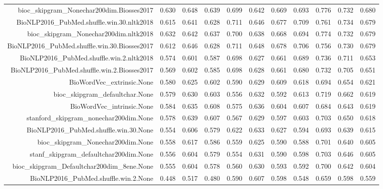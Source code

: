 \begin{table}[!h]
\begin{tabular}{rrrrrrrrrrr}
  bioc\_skipgram\_Nonechar200dim.Biosses2017 & 0.630 & 0.648 & 0.639 & 0.699 & 0.642 & 0.669 & 0.693 & 0.776 & 0.732 & 0.680 \\ 
  BioNLP2016\_PubMed.shuffle.win.30.nltk2018 & 0.615 & 0.641 & 0.628 & 0.711 & 0.646 & 0.677 & 0.709 & 0.761 & 0.734 & 0.679 \\ 
  bioc\_skipgram\_Nonechar200dim.nltk2018 & 0.632 & 0.642 & 0.637 & 0.700 & 0.638 & 0.668 & 0.694 & 0.774 & 0.732 & 0.679 \\ 
  BioNLP2016\_PubMed.shuffle.win.30.Biosses2017 & 0.612 & 0.646 & 0.628 & 0.711 & 0.648 & 0.678 & 0.706 & 0.756 & 0.730 & 0.679 \\ 
  BioNLP2016\_PubMed.shuffle.win.2.nltk2018 & 0.574 & 0.601 & 0.587 & 0.698 & 0.627 & 0.661 & 0.689 & 0.736 & 0.711 & 0.653 \\ 
  BioNLP2016\_PubMed.shuffle.win.2.Biosses2017 & 0.569 & 0.602 & 0.585 & 0.698 & 0.628 & 0.661 & 0.680 & 0.732 & 0.705 & 0.651 \\ 
  BioWordVec\_extrinsic.None & 0.580 & 0.625 & 0.602 & 0.590 & 0.629 & 0.609 & 0.618 & 0.694 & 0.654 & 0.621 \\ 
  bioc\_skipgram\_defaultchar.None & 0.579 & 0.630 & 0.603 & 0.556 & 0.632 & 0.592 & 0.613 & 0.719 & 0.662 & 0.619 \\ 
  BioWordVec\_intrinsic.None & 0.584 & 0.635 & 0.608 & 0.575 & 0.636 & 0.604 & 0.607 & 0.684 & 0.643 & 0.619 \\ 
  stanford\_skipgram\_nonechar200dim.None & 0.578 & 0.639 & 0.607 & 0.567 & 0.629 & 0.597 & 0.603 & 0.703 & 0.650 & 0.618 \\ 
  BioNLP2016\_PubMed.shuffle.win.30.None & 0.554 & 0.606 & 0.579 & 0.622 & 0.633 & 0.627 & 0.594 & 0.693 & 0.639 & 0.615 \\ 
  bioc\_skipgram\_Nonechar200dim.None & 0.558 & 0.617 & 0.586 & 0.559 & 0.625 & 0.590 & 0.588 & 0.701 & 0.640 & 0.605 \\ 
  stanf\_skipgram\_defaultchar200dim.None & 0.556 & 0.604 & 0.579 & 0.554 & 0.631 & 0.590 & 0.598 & 0.703 & 0.646 & 0.605 \\ 
  bioc\_skipgram\_Defaultchar200dim\_8ene.None & 0.555 & 0.604 & 0.578 & 0.560 & 0.630 & 0.593 & 0.592 & 0.700 & 0.642 & 0.604 \\ 
  BioNLP2016\_PubMed.shuffle.win.2.None & 0.448 & 0.517 & 0.480 & 0.590 & 0.607 & 0.598 & 0.548 & 0.659 & 0.598 & 0.559 \\ 
   \hline
\end{tabular}
\endgroup
\end{table}
